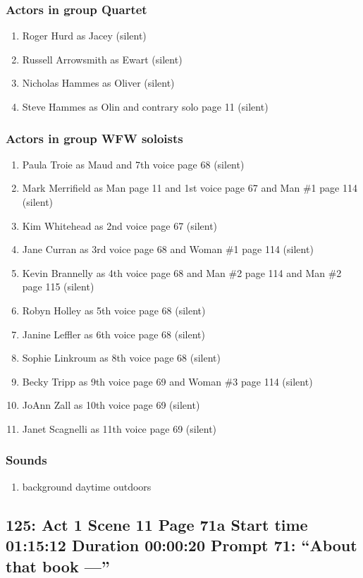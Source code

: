 \subsubsection{Actors in group Quartet}
\begin{enumerate}
\item Roger Hurd as Jacey (silent)
\item Russell Arrowsmith as Ewart (silent)
\item Nicholas Hammes as Oliver (silent)
\item Steve Hammes as Olin and contrary solo page 11 (silent)
\end{enumerate}
\subsubsection{Actors in group WFW soloists}
\begin{enumerate}
\item Paula Troie as Maud and 7th voice page 68 (silent)
\item Mark Merrifield as Man page 11 and 1st voice page 67 and Man \#1 page 114 (silent)
\item Kim Whitehead as 2nd voice page 67 (silent)
\item Jane Curran as 3rd voice page 68 and Woman \#1 page 114 (silent)
\item Kevin Brannelly as 4th voice page 68 and Man \#2 page 114 and Man \#2 page 115 (silent)
\item Robyn Holley as 5th voice page 68 (silent)
\item Janine Leffler as 6th voice page 68 (silent)
\item Sophie Linkroum as 8th voice page 68 (silent)
\item Becky Tripp as 9th voice page 69 and Woman \#3 page 114 (silent)
\item JoAnn Zall as 10th voice page 69 (silent)
\item Janet Scagnelli as 11th voice page 69 (silent)
\end{enumerate}

\subsubsection{Sounds}
\begin{enumerate}
\item background daytime outdoors
\end{enumerate}
\subsection{125: Act 1 Scene 11 Page 71a Start time 01:15:12 Duration 00:00:20 Prompt 71: ``About that book ---''}

